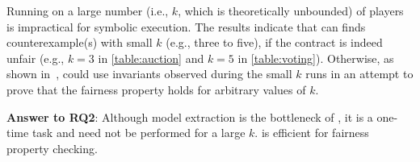 

Running \faircon on a large number (i.e., $k$, which is theoretically unbounded) of players is
impractical for symbolic execution.
The results indicate that \faircon can finds counterexample(s) with small $k$ (e.g., three to five),
if the contract is indeed unfair (e.g., $k=3$ in \cref{table:auction} and $k=5$ in
\cref{table:voting}).
Otherwise, as shown in~, \faircon could use invariants observed during the small $k$
runs in an attempt to prove that the fairness property holds for arbitrary values of $k$.

\begin{tcolorbox}[size=title, opacityfill=0.1] \textbf{Answer to RQ2}:
	Although model extraction is the bottleneck of \faircon, it is a one-time task and need not be
	performed for a large $k$.
	\faircon is efficient for fairness property checking.
\end{tcolorbox}


